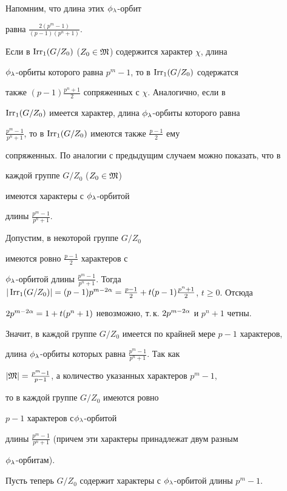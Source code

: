 Напомним, что длина этих $\phi_\lambda$-орбит


равна $\frac{2(p^m-1)}{(p-1)(p^n+1)}$.


Если в $\operatorname{Irr_1}(G/Z_0)$ ($Z_0\in\frak M$) содержится характер $\chi$, длина


$\phi_\lambda$-орбиты которого равна $p^m-1$, то в $\operatorname{Irr_1}(G/Z_0)$ содержатся


также $(p-1)\frac{p^n+1}{2}$ сопряженных с $\chi$. Аналогично, если в 


$\operatorname{Irr_1}(G/Z_0)$ имеется характер, длина $\phi_\lambda$-орбиты которого равна


$\frac{p^m-1}{p^n+1}$, то в $\operatorname{Irr_1}(G/Z_0)$ имеются также $\frac{p-1}{2}$ ему


сопряженных. По аналогии с предыдущим случаем можно показать, что в


каждой группе $G/Z_0$ ($Z_0\in\frak M$)


имеются характеры с $\phi_\lambda$-орбитой


длины $\frac{p^m-1}{p^n+1}$.





Допустим, в некоторой группе $G/Z_0$


имеются ровно $\frac{p-1}{2}$ характеров с 


$\phi_\la$-орбитой длины $\frac{p^m-1}{p^n+1}$. Тогда $|\Irr(G/Z_0)|=


(p-1)p^{m-2\al}=\frac{p-1}{2}+t(p-1)\frac{p^n+1}{2}$, $t\ge0$. Отсюда 


$2p^{m-2\alpha}=1+t(p^n+1)$ невозможно, т.\,к. $2p^{m-2\alpha}$ и $p^n+1$ четны. 


Значит, в каждой группе $G/Z_0$ имеется по крайней мере $p-1$ характеров, 


длина $\phi_\lambda$-орбиты которых равна $\frac{p^m-1}{p^n+1}$. Так как 


$|\frak M|=\frac{p^m-1}{p-1}$, а количество указанных характеров $p^m-1$,


то в каждой группе $G/Z_0$ имеются ровно


$p-1$ характеров с\linebreak $\phi_\lambda$-орбитой


длины $\frac{p^m-1}{p^n+1}$ (причем эти характеры принадлежат двум разным


$\phi_\lambda$-орбитам). 





Пусть теперь $G/Z_0$ содержит характеры с $\phi_\lambda$-орбитой длины $p^m-1$.


